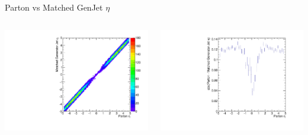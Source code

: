 \documentclass[8pt]{beamer}
\begin{document}
\begin{frame}{Parton vs Matched GenJet $\eta$}

\begin{block}

\begin{columns}

\includegraphics[width=\linewidth]{PartonvsGenJet_Eta.pdf}

\includegraphics[width=\linewidth]{Profile_PartonvsGenJet_DiffEta.pdf}

\end{columns}

\end{block}

\end{frame}
\end{document}

